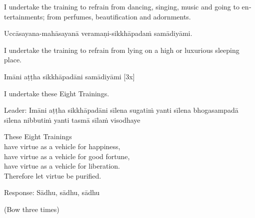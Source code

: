 \begin{english}
  I undertake the training to refrain from dancing, singing, music and going to entertainments; from perfumes, beautification and adornments.\\
  \end{english}

Uccāsayana-mahāsayanā veramaṇi-sikkhāpadaṁ samādiyāmi.\\

\begin{english}
  I undertake the training to refrain from lying on a high or luxurious sleeping place.\\
\end{english}

Imāni aṭṭha sikkhāpadāni samādiyāmi \hfill{[3x]}\\

\begin{english}
  I undertake these Eight Trainings.\\
\end{english}

Leader: Imāni aṭṭha sikkhāpadāni sīlena sugatiṁ yanti sīlena bhogasampadā sīlena nibbutiṁ yanti tasmā sīlaṁ visodhaye\\

\begin{english}
  These Eight Trainings\\
  have virtue as a vehicle for happiness,\\
  have virtue as a vehicle for good fortune,\\
  have virtue as a vehicle for liberation.\\
  Therefore let virtue be purified.\\
  \end{english}

Response: Sādhu, sādhu, sādhu\\

\begin{center}
  (Bow three times)\\
\end{center}
